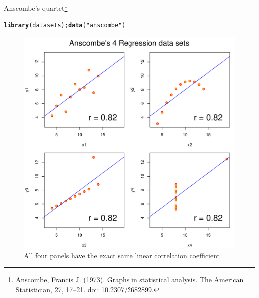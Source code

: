 \documentclass[10pt,handout]{beamer}\usepackage[]{graphicx}\usepackage[]{color}
\makeatletter
\newcommand{\hlstr}[1]{\textcolor[rgb]{0.192,0.494,0.8}{#1}}%
\newcommand{\hlstd}[1]{\textcolor[rgb]{0.345,0.345,0.345}{#1}}%
\newcommand{\hlkwd}[1]{\textcolor[rgb]{0.737,0.353,0.396}{\textbf{#1}}}%
\newenvironment{kframe}{%
 \def\at@end@of@kframe{}%
 \ifinner\ifhmode%
  \def\at@end@of@kframe{\end{minipage}}%
  \begin{minipage}{\columnwidth}%
 \fi\fi%
 \def\FrameCommand##1{\hskip\@totalleftmargin \hskip-\fboxsep
 \colorbox{shadecolor}{##1}\hskip-\fboxsep
     \hskip-\linewidth \hskip-\@totalleftmargin \hskip\columnwidth}%
 \MakeFramed {\advance\hsize-\width
   \@totalleftmargin\z@ \linewidth\hsize
   \@setminipage}}%
 {\par\unskip\endMakeFramed%
 \at@end@of@kframe}
\newenvironment{knitrout}{}{} %
\makeatother
\begin{document}
\begin{frame}[fragile]{Anscombe's quartet\footnote{\tiny{Anscombe, Francis J. (1973). Graphs in statistical analysis. The American Statistician, 27, 17–21. doi: 10.2307/2682899.}}}
	
\begin{knitrout}\tiny
{}\color{fgcolor}\begin{kframe}
\begin{alltt}
\hlkwd{library}\hlstd{(datasets);}\hlkwd{data}\hlstd{(}\hlstr{"anscombe"}\hlstd{)}
\end{alltt}
\end{kframe}\begin{figure}

{\centering \includegraphics[width=0.55\linewidth]{figure/unnamed-chunk-5-1} 

}

\caption[All four panels have the exact same linear correlation coefficient]{All four panels have the exact same linear correlation coefficient}\label{fig:unnamed-chunk-5}
\end{figure}

\end{knitrout}


\end{frame}
\end{document}
